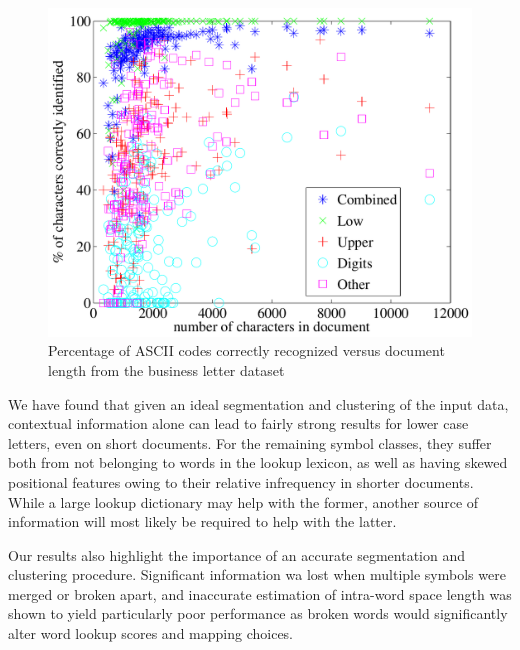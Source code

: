 \documentclass[times, 10pt,twocolumn]{article}
\begin{document}
\begin{figure}[ht]
  \centering
  \includegraphics[scale=.5]{figures/acc_v_doclen}
  \caption{Percentage of ASCII codes correctly recognized versus document
  length from the business letter dataset}
  \label{acc_v_doclen_fig}
\end{figure}



We have found that given an ideal segmentation and clustering of the input
data, contextual information alone can lead to fairly strong results for lower
case letters, even on short documents.  For the remaining symbol classes, they
suffer both from not belonging to words in the lookup lexicon, as well as
having skewed positional features owing to their relative infrequency in shorter
documents.  While a large lookup dictionary may help with the former, another
source of information will most likely be required to help with the latter.

Our results also highlight the importance of an accurate segmentation and
clustering procedure.  Significant information wa lost when multiple symbols
were merged or broken apart, and inaccurate estimation of intra-word space
length was shown to yield particularly poor performance as broken words would
significantly alter word lookup scores and mapping choices.




\end{document}
